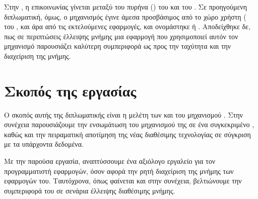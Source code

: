 Στην , η επικοινωνίας γίνεται μεταξύ του πυρήνα ()
του  και του . Σε προηγούμενη διπλωματική, όμως, ο μηχανισμός
έγινε άμεσα προσβάσιμος από το χώρο χρήστη ( του , και άρα
από τις εκτελούμενες εφαρμογές, και ονομάστηκε  ή . Αποδείχθηκε δε, πως σε περιπτώσεις έλλειψης μνήμης μια
εφαρμογή που χρησιμοποιεί αυτόν τον μηχανισμό παρουσιάζει καλύτερη
συμπεριφορά ως προς την ταχύτητα και την διαχείριση της μνήμης\cite{paperAimiliou}.

\section{Σκοπός της εργασίας}

Ο σκοπός αυτής της διπλωματικής είναι η μελέτη των 
και του μηχανισμού . Στην συνέχεια παρουσιάζουμε την ενσωμάτωση του
μηχανισμού της  σε ένα συγκεκριμένο , καθώς και
την πειραματική αποτίμηση της νέας διαθέσιμης τεχνολογίας σε σύγκριση με
τα υπάρχοντα δεδομένα.
\newline

Με την παρούσα εργασία, αναπτύσσουμε ένα αξιόλογο εργαλείο για τον
προγραμματιστή  εφαρμογών, όσον αφορά την ρητή διαχείριση
της μνήμης των εφαρμογών του. Ταυτόχρονα, όπως φαίνεται και στην συνέχεια,
βελτιώνουμε την συμπεριφορά του  σε σενάρια έλλειψης διαθέσιμης μνήμης.
